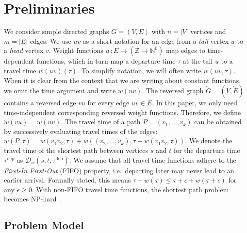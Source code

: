 \documentclass[a4paper,UKenglish,cleveref, autoref, thm-restate,anonymous]{lipics-v2021}
\newcommand*{\dist}{\mathcal{D}}
\newcommand*{\tdep}{\tau^{\operatorname{dep}}}
\begin{document}
\section{Preliminaries}
We consider simple directed graphs $G=(V,E)$ with $n=|V|$ vertices and $m=|E|$ edges.
We use $uv$ as a short notation for an edge from a \emph{tail} vertex $u$ to a \emph{head} vertex $v$.
Weight functions $w : E \to (\mathbb{Z} \to \mathbb{N}^0)$ map edges to time-dependent functions, which in turn map a departure time $\tau$ at the tail $u$ to a travel time $w(uv)(\tau)$.
To simplify notation, we will often write $w(uv, \tau)$.
When it is clear from the context that we are writing about constant functions, we omit the time argument and write $w(uv)$.
The reversed graph $\overleftarrow{G} = (V, \overleftarrow{E})$ contains a reversed edge $vu$ for every edge $uv \in E$.
In this paper, we only need time-independent corresponding reversed weight functions.
Therefore, we define $\overleftarrow{w}(vu) = w(uv)$.
The travel time of a path $P = (v_1,\dots,v_k)$ can be obtained by successively evaluating travel times of the edges: $w(P, \tau) = w(v_1 v_2, \tau) + w((v_2,\dots,v_k), \tau + w(v_1 v_2, \tau))$.
We denote the travel time of the shortest path between vertices $s$ and $t$ for the departure time $\tdep$ as $\dist_w(s,t,\tdep)$.
We assume that all travel time functions adhere to the \emph{First-In First-Out} (FIFO) property, i.e.\ departing later may never lead to an earlier arrival.
Formally stated, this means $\tau + w(\tau) \leq \tau + \epsilon + w(\tau + \epsilon)$ for any $\epsilon \geq 0$.
With non-FIFO travel time functions, the shortest path problem becomes \textsf{NP}-hard~\cite{or-tnp-89}.

\subsection{Problem Model}
\end{document}
